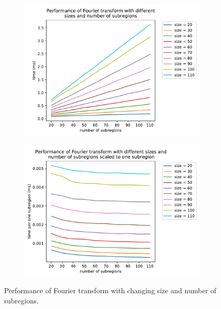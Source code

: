 \begin{figure}
	\begin{subfigure}{.5\textwidth}
		\centering
		\includegraphics[width=\linewidth]{img/eval/fourier-transform-roi-count}
		\caption{}
		\label{fourier-transform-roi-count:basic}
	\end{subfigure}%
	\begin{subfigure}{.5\textwidth}
		\centering
		\includegraphics[width=\linewidth]{img/eval/fourier-transform-roi-count-scaled}
		\caption{}
		\label{fourier-transform-roi-count:scaled}
	\end{subfigure}
	\caption{Performance of Fourier transform with changing size and number of subregions.}
	\label{fourier-transform-roi-count}
\end{figure}

